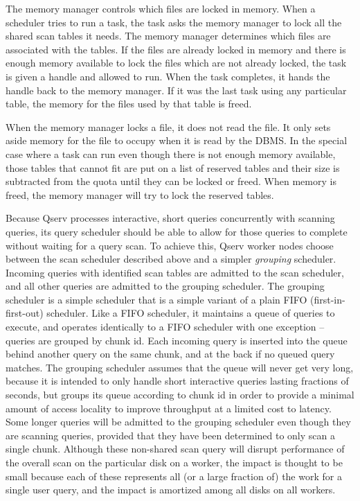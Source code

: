 \documentclass[DM,lsstdraft,toc]{lsstdoc}
\begin{document}
The memory manager controls which files are locked in memory. When a
scheduler tries to run a task, the task asks the memory manager to lock
all the shared scan tables it needs. The memory manager determines which
files are associated with the tables. If the files are already locked in
memory and there is enough memory available to lock the files which are
not already locked, the task is given a handle and allowed to run. When
the task completes, it hands the handle back to the memory manager. If
it was the last task using any particular table, the memory for the
files used by that table is freed.

When the memory manager locks a file, it does not read the file. It only
sets aside memory for the file to occupy when it is read by the DBMS. In
the special case where a task can run even though there is not enough
memory available, those tables that cannot fit are put on a list of
reserved tables and their size is subtracted from the quota until they
can be locked or freed. When memory is freed, the memory manager will
try to lock the reserved tables.

Because Qserv processes interactive, short queries concurrently with
scanning queries, its query scheduler should be able to allow for those
queries to complete without waiting for a query scan. To achieve this,
Qserv worker nodes choose between the scan scheduler described above and
a simpler \emph{grouping} scheduler. Incoming queries with identified
scan tables are admitted to the scan scheduler, and all other queries
are admitted to the grouping scheduler. The grouping scheduler is a
simple scheduler that is a simple variant of a plain FIFO
(first-in-first-out) scheduler. Like a FIFO scheduler, it maintains a
queue of queries to execute, and operates identically to a FIFO
scheduler with one exception -- queries are grouped by chunk id. Each
incoming query is inserted into the queue behind another query on the
same chunk, and at the back if no queued query matches. The grouping
scheduler assumes that the queue will never get very long, because it is
intended to only handle short interactive queries lasting fractions of
seconds, but groups its queue according to chunk id in order to provide
a minimal amount of access locality to improve throughput at a limited
cost to latency. Some longer queries will be admitted to the grouping
scheduler even though they are scanning queries, provided that they have
been determined to only scan a single chunk. Although these non-shared
scan query will disrupt performance of the overall scan on the
particular disk on a worker, the impact is thought to be small because
each of these represents all (or a large fraction of) the work for a
single user query, and the impact is amortized among all disks on all
workers.
\end{document}
